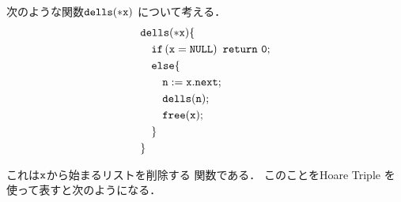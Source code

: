 \documentclass[a4paper, 10pt]{ltjsarticle}
\begin{document}
  次のような関数$\mathtt{dells(*x)}$
  について考える．
  \begin{align*}
    & \mathprogramsy{dells(*x)} \{  \\
      &\quad \mathprogramsy{if\left(x=NULL\right)\ return\ 0;} %
   \\
      &\quad   \mathprogramsy{else \{}  %
   \\
      &\qquad  \mathprogramsy{n := x.next;}  %
   \\
      &\qquad  \mathprogramsy{dells(n);}  %
   \\
      &\qquad  \mathprogramsy{free(x);}   %
   \\
      &\quad \mathprogramsy{\}} %
   \\
      &\mathprogramsy{\}} %
  \end{align*}

  これは$\mathtt{x}$から始まるリストを削除する
  関数である．
  このことをHoare Triple を使って表すと次のようになる．
\end{document}
